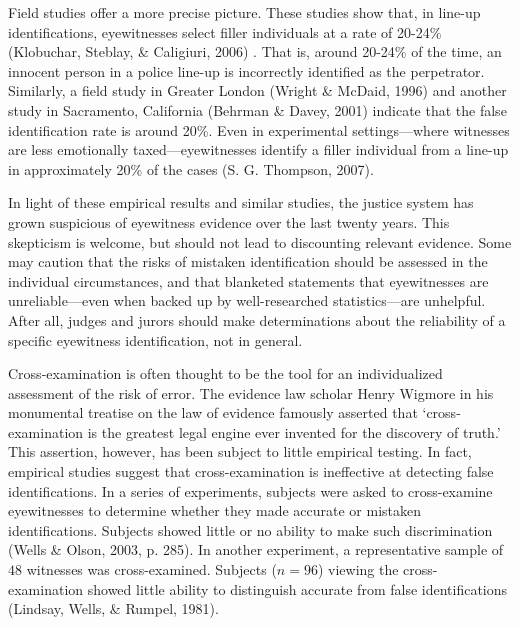 \documentclass[
  10pt,
  dvipsnames,enabledeprecatedfontcommands]{scrartcl}
\begin{document}
Field studies offer a more precise picture. These studies show that, in
line-up identifications, eyewitnesses select filler individuals at a
rate of 20-24\% (Klobuchar, Steblay, \& Caligiuri, 2006) . That is,
around 20-24\% of the time, an innocent person in a police line-up is
incorrectly identified as the perpetrator. Similarly, a field study in
Greater London (Wright \& McDaid, 1996) and another study in Sacramento,
California (Behrman \& Davey, 2001) indicate that the false
identification rate is around 20\%. Even in experimental
settings---where witnesses are less emotionally taxed---eyewitnesses
identify a filler individual from a line-up in approximately 20\% of the
cases (S. G. Thompson, 2007).

In light of these empirical results and similar studies, the justice
system has grown suspicious of eyewitness evidence over the last twenty
years. This skepticism is welcome, but should not lead to discounting
relevant evidence. Some may caution that the risks of mistaken
identification should be assessed in the individual circumstances, and
that blanketed statements that eyewitnesses are unreliable---even when
backed up by well-researched statistics---are unhelpful. After all,
judges and jurors should make determinations about the reliability of a
specific eyewitness identification, not in general.

Cross-examination is often thought to be the tool for an individualized
assessment of the risk of error. The evidence law scholar Henry Wigmore
in his monumental treatise on the law of evidence famously asserted that
`cross-examination is the greatest legal engine ever invented for the
discovery of truth.' This assertion, however, has been subject to little
empirical testing.  In fact, empirical studies
suggest that cross-examination is ineffective at detecting false
identifications. In a series of experiments, subjects were asked to
cross-examine eyewitnesses to determine whether they made accurate or
mistaken identifications. Subjects showed little or no ability to make
such discrimination (Wells \& Olson, 2003, p. 285). In another
experiment, a representative sample of \(48\) witnesses was
cross-examined. Subjects (\(n = 96\)) viewing the cross-examination
showed little ability to distinguish accurate from false identifications
(Lindsay, Wells, \& Rumpel, 1981).
\end{document}
